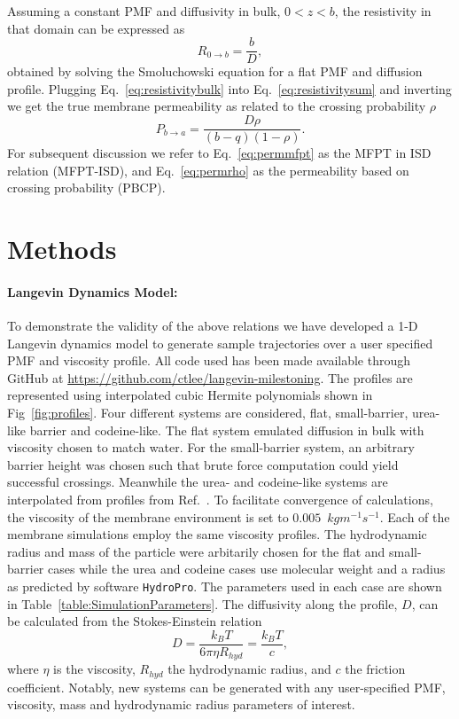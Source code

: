         Assuming a constant PMF and diffusivity in bulk, $0<z<b$, the resistivity in that domain can be expressed as
        \begin{equation}
            R_{0\rightarrow b} = \frac{b}{D},
            \label{eq:resistivitybulk}
        \end{equation}
        obtained by solving the Smoluchowski equation for a flat PMF and diffusion profile. Plugging Eq.~\ref{eq:resistivitybulk} into Eq.~\ref{eq:resistivitysum} and inverting we get the true membrane permeability as related to the crossing probability $\rho$
        \begin{equation}
            P_{b\rightarrow a} = \frac{D\rho}{(b-q)(1-\rho)}.
            \label{eq:permrho}
        \end{equation}
        For subsequent discussion we refer to Eq.~\ref{eq:permmfpt} as the MFPT in ISD relation (MFPT-ISD), and Eq.~\ref{eq:permrho} as the permeability based on crossing probability (PBCP).


\section{Methods}
    \paragraph{Langevin Dynamics Model:} To demonstrate the validity of the above relations we have developed a 1-D Langevin dynamics model to generate sample trajectories over a user specified PMF and viscosity profile. All code used has been made available through GitHub at \url{https://github.com/ctlee/langevin-milestoning}. The profiles are represented using interpolated cubic Hermite polynomials shown in Fig~\ref{fig:profiles}. Four different systems are considered, flat, small-barrier, urea-like barrier and codeine-like. The flat system emulated diffusion in bulk with viscosity chosen to match water. For the small-barrier system, an arbitrary barrier height was chosen such that brute force computation could yield successful crossings. Meanwhile the urea- and codeine-like systems are interpolated from profiles from Ref.~. To facilitate convergence of calculations, the viscosity of the membrane environment is set to $0.005$~$kg m^{-1}s^{-1}$. Each of the membrane simulations employ the same viscosity profiles. The hydrodynamic radius and mass of the particle were arbitarily chosen for the flat and small-barrier cases while the urea and codeine cases use molecular weight and a radius as predicted by software \texttt{HydroPro}\cite{Ortega2011}. The parameters used in each case are shown in Table~\ref{table:SimulationParameters}. The diffusivity along the profile, $D$, can be calculated from the Stokes-Einstein relation
    \begin{equation}
        D = \frac{k_BT}{6\pi\eta R_{hyd}} = \frac{k_BT}{c},
        \label{eq:stokes-einstein}
    \end{equation}
    where $\eta$ is the viscosity, $R_{hyd}$ the hydrodynamic radius, and $c$ the friction coefficient. Notably, new systems can be generated with any user-specified PMF, viscosity, mass and hydrodynamic radius parameters of interest.

